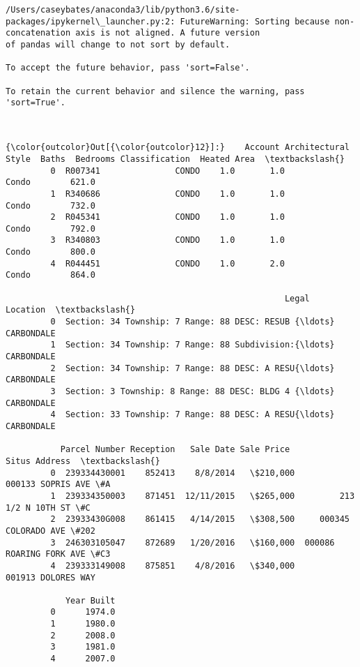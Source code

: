 \documentclass[11pt]{article}
\begin{document}
    \begin{Verbatim}[commandchars=\\\{\}]
/Users/caseybates/anaconda3/lib/python3.6/site-packages/ipykernel\_launcher.py:2: FutureWarning: Sorting because non-concatenation axis is not aligned. A future version
of pandas will change to not sort by default.

To accept the future behavior, pass 'sort=False'.

To retain the current behavior and silence the warning, pass 'sort=True'.

  

    \end{Verbatim}

\begin{Verbatim}[commandchars=\\\{\}]
{\color{outcolor}Out[{\color{outcolor}12}]:}    Account Architectural Style  Baths  Bedrooms Classification  Heated Area  \textbackslash{}
         0  R007341               CONDO    1.0       1.0          Condo        621.0   
         1  R340686               CONDO    1.0       1.0          Condo        732.0   
         2  R045341               CONDO    1.0       1.0          Condo        792.0   
         3  R340803               CONDO    1.0       1.0          Condo        800.0   
         4  R044451               CONDO    1.0       2.0          Condo        864.0   
         
                                                        Legal    Location  \textbackslash{}
         0  Section: 34 Township: 7 Range: 88 DESC: RESUB {\ldots}  CARBONDALE   
         1  Section: 34 Township: 7 Range: 88 Subdivision:{\ldots}  CARBONDALE   
         2  Section: 34 Township: 7 Range: 88 DESC: A RESU{\ldots}  CARBONDALE   
         3  Section: 3 Township: 8 Range: 88 DESC: BLDG 4 {\ldots}  CARBONDALE   
         4  Section: 33 Township: 7 Range: 88 DESC: A RESU{\ldots}  CARBONDALE   
         
           Parcel Number Reception   Sale Date Sale Price                Situs Address  \textbackslash{}
         0  239334430001    852413    8/8/2014   \$210,000         000133 SOPRIS AVE \#A   
         1  239334350003    871451  12/11/2015   \$265,000         213 1/2 N 10TH ST \#C   
         2  23933430G008    861415   4/14/2015   \$308,500     000345 COLORADO AVE \#202   
         3  246303105047    872689   1/20/2016   \$160,000  000086 ROARING FORK AVE \#C3   
         4  239333149008    875851    4/8/2016   \$340,000           001913 DOLORES WAY   
         
            Year Built  
         0      1974.0  
         1      1980.0  
         2      2008.0  
         3      1981.0  
         4      2007.0  
\end{Verbatim}
            
\end{document}
